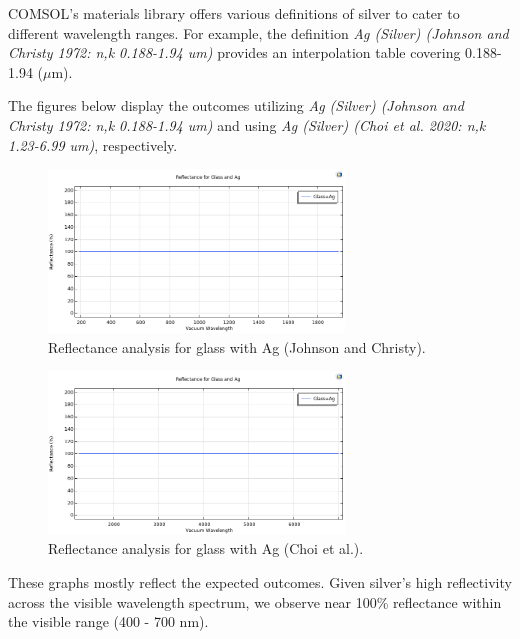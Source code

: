 COMSOL's materials library offers various definitions of silver to cater to different wavelength ranges. For example, the definition \emph{Ag (Silver) (Johnson and Christy 1972: n,k 0.188-1.94 um)} provides an interpolation table covering 0.188-1.94 ($\mu$m).

The figures below display the outcomes utilizing \emph{Ag (Silver) (Johnson and Christy 1972: n,k 0.188-1.94 um)} and using \emph{Ag (Silver) (Choi et al. 2020: n,k 1.23-6.99 um)}, respectively.

\begin{figure}[H]
  \centering
  \includegraphics[width=0.7\textwidth]{Chapters/Figures/Chapter 4 Figures/Reflectance for glass and Ag (Johnson and Christy).png}
  \caption{Reflectance analysis for glass with Ag (Johnson and Christy).}
  \label{fig:Reflectance analysis for glass with Ag (Johnson and Christy)}
\end{figure}

\begin{figure}[H]
  \centering
  \includegraphics[width=0.7\textwidth]{Chapters/Figures/Chapter 4 Figures/Reflectance for glass and Ag for Choi et al.png}
  \caption{Reflectance analysis for glass with Ag (Choi et al.).}
  \label{fig:Reflectance analysis for glass with Ag (Choi et al)}
\end{figure}

These graphs mostly reflect the expected outcomes. Given silver's high reflectivity across the visible wavelength spectrum, we observe near 100\% reflectance within the visible range (400 - 700 nm).

